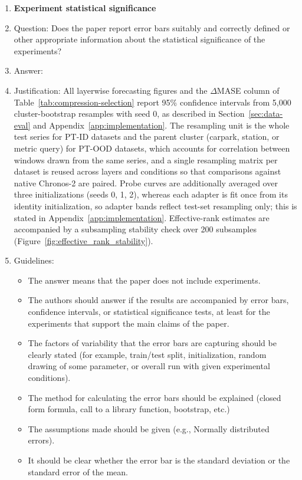 \begin{enumerate}
\item {\bf Experiment statistical significance}
    \item[] Question: Does the paper report error bars suitably and correctly defined or other appropriate information about the statistical significance of the experiments?
    \item[] Answer: \answerYes{}
    \item[] Justification: All layerwise forecasting figures and the \(\Delta\)MASE column of Table~\ref{tab:compression-selection} report 95\% confidence intervals from 5{,}000 cluster-bootstrap resamples with seed 0, as described in Section~\ref{sec:data-eval} and Appendix~\ref{app:implementation}. The resampling unit is the whole test series for PT-ID datasets and the parent cluster (carpark, station, or metric query) for PT-OOD datasets, which accounts for correlation between windows drawn from the same series, and a single resampling matrix per dataset is reused across layers and conditions so that comparisons against native Chronos-2 are paired. Probe curves are additionally averaged over three initializations (seeds 0, 1, 2), whereas each adapter is fit once from its identity initialization, so adapter bands reflect test-set resampling only; this is stated in Appendix~\ref{app:implementation}. Effective-rank estimates are accompanied by a subsampling stability check over 200 subsamples (Figure~\ref{fig:effective_rank_stability}).
    \item[] Guidelines:
    \begin{itemize}
        \item The answer \answerNA{} means that the paper does not include experiments.
        \item The authors should answer \answerYes{} if the results are accompanied by error bars, confidence intervals, or statistical significance tests, at least for the experiments that support the main claims of the paper.
        \item The factors of variability that the error bars are capturing should be clearly stated (for example, train/test split, initialization, random drawing of some parameter, or overall run with given experimental conditions).
        \item The method for calculating the error bars should be explained (closed form formula, call to a library function, bootstrap, etc.)
        \item The assumptions made should be given (e.g., Normally distributed errors).
        \item It should be clear whether the error bar is the standard deviation or the standard error of the mean.

\end{itemize}
\end{enumerate}
